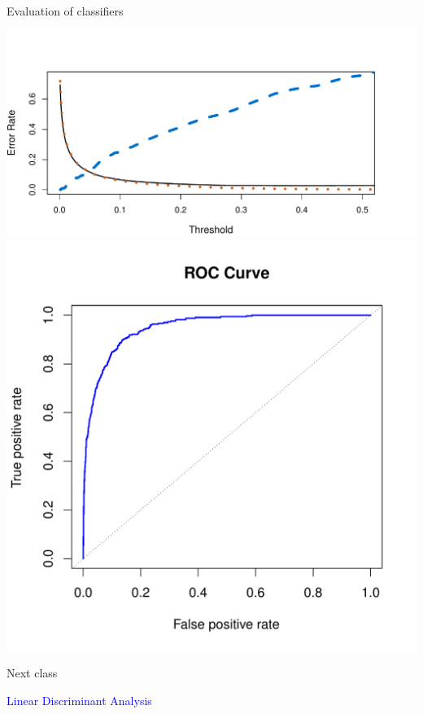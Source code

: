 \documentclass[14pt]{beamer}
\begin{document}
\begin{frame}{Evaluation of classifiers}\large

\centerline{\includegraphics[width=.55\textwidth]{4-7} \includegraphics[width=.5\textwidth]{4-8}}

\end{frame}



\begin{frame}{Next class}

\begin{center} \textcolor{blue}{Linear Discriminant Analysis} \end{center}

\end{frame}
\end{document}
